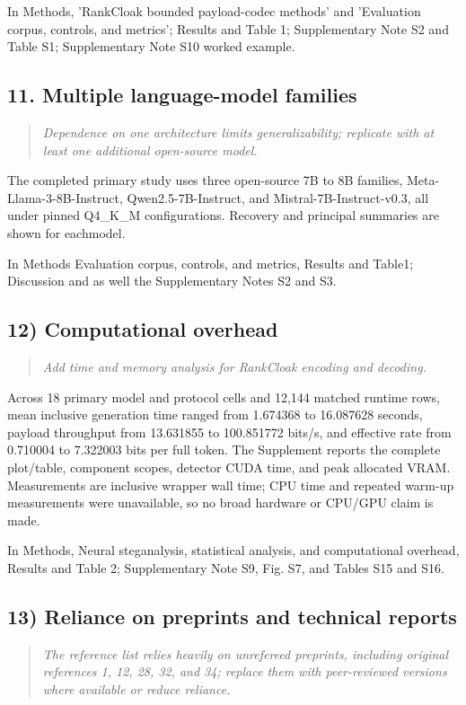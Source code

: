 \documentclass[11pt]{article}
\newenvironment{reviewcomment}{\begin{quote}\color{commentgray}\itshape}{\end{quote}}
\begin{document}
In Methods, 'RankCloak bounded payload-codec methods' and 'Evaluation corpus, controls, and metrics'; Results and Table 1; Supplementary Note S2 and Table S1; Supplementary Note S10 worked example.

\subsection*{11. Multiple language-model families}
\begin{reviewcomment}
Dependence on one architecture limits generalizability; replicate with at least one additional open-source model.
\end{reviewcomment}

The completed primary study uses three open-source 7B to 8B families, Meta-Llama-3-8B-Instruct, Qwen2.5-7B-Instruct, and Mistral-7B-Instruct-v0.3, all under pinned Q4\_K\_M configurations. Recovery and principal summaries are shown for eachmodel.

In Methods  Evaluation corpus, controls, and metrics, Results and Table1; Discussion and as well the Supplementary Notes S2 and S3.

\subsection*{12) Computational overhead}
\begin{reviewcomment}
Add time and memory analysis for RankCloak encoding and decoding.
\end{reviewcomment}

Across 18 primary model and protocol cells and 12,144 matched runtime rows, mean inclusive generation time ranged from 1.674368 to 16.087628 seconds, payload throughput from 13.631855 to 100.851772 bits/s, and effective rate from 0.710004 to 7.322003 bits per full token. The Supplement reports the complete plot/table, component scopes, detector CUDA time, and peak allocated VRAM. Measurements are inclusive wrapper wall time; CPU time and repeated warm-up measurements were unavailable, so no broad hardware or CPU/GPU claim is made.

In Methods, Neural steganalysis, statistical analysis, and computational overhead, Results and Table 2; Supplementary Note S9, Fig. S7, and Tables S15 and S16.

\subsection*{13) Reliance on preprints and technical reports}
\begin{reviewcomment}
The reference list relies heavily on unrefereed preprints, including original references 1, 12, 28, 32, and 34; replace them with peer-reviewed versions where available or reduce reliance.
\end{reviewcomment}
\end{document}
